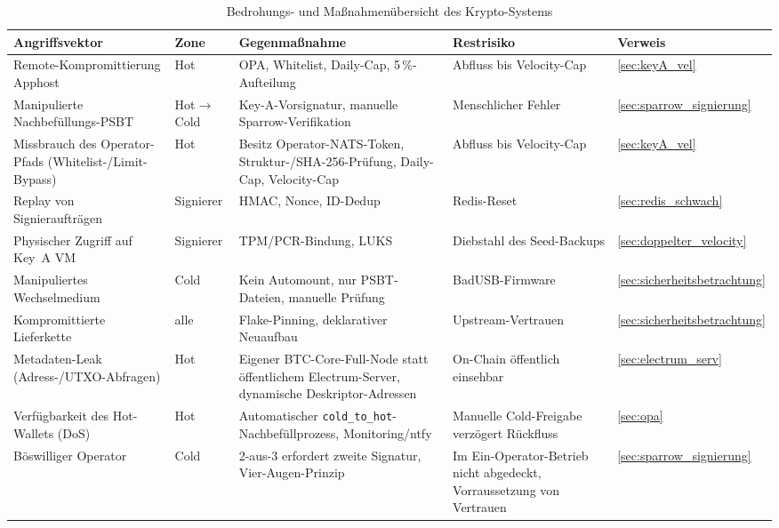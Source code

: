 \begin{table}[htbp]
\centering
\footnotesize
\begin{tabular}{@{}p{3.3cm} l p{4.0cm} p{3.4cm} l@{}}
\toprule
\textbf{Angriffsvektor} & \textbf{Zone} & \textbf{Gegenmaßnahme} & \textbf{Restrisiko} & \textbf{Verweis} \\
\midrule
Remote-Kompromittierung Apphost & Hot & \ac{OPA}, Whitelist, Daily-Cap, 5\,\%-Aufteilung & Abfluss bis Velocity-Cap & \ref{sec:keyA_vel} \\
\midrule
Manipulierte Nachbefüllungs-\ac{PSBT} & Hot$\to$Cold & Key-A-Vorsignatur, manuelle Sparrow-Verifikation & Menschlicher Fehler & \ref{sec:sparrow_signierung} \\
\midrule
Missbrauch des Operator-Pfads (Whitelist-/Limit-Bypass) & Hot & Besitz Operator-\ac{NATS}-Token, Struktur-/SHA-256-Prüfung, Daily-Cap, Velocity-Cap & Abfluss bis Velocity-Cap & \ref{sec:keyA_vel} \\
\midrule
Replay von Signieraufträgen & Signierer & \acs{HMAC}, Nonce, \acs{ID}-Dedup & Redis-Reset & \ref{sec:redis_schwach} \\
\midrule
Physischer Zugriff auf Key~A \ac{VM} & Signierer & \acs{TPM}/\acs{PCR}-Bindung, LUKS & Diebstahl des Seed-Backups & \ref{sec:doppelter_velocity} \\
\midrule
Manipuliertes Wechselmedium & Cold & Kein Automount, nur \ac{PSBT}-Dateien, manuelle Prüfung & BadUSB-Firmware & \ref{sec:sicherheitsbetrachtung} \\
\midrule
Kompromittierte Lieferkette & alle & Flake-Pinning, deklarativer Neuaufbau & Upstream-Vertrauen & \ref{sec:sicherheitsbetrachtung} \\
\midrule
Metadaten-Leak (Adress-/\acs{UTXO}-Abfragen) & Hot & Eigener \acs{BTC}-Core-Full-Node statt öffentlichem Electrum-Server, dynamische Deskriptor-Adressen & On-Chain öffentlich einsehbar & \ref{sec:electrum_serv} \\
\midrule
Verfügbarkeit des Hot-Wallets (\acs{DoS}) & Hot & Automatischer \texttt{cold\_to\_hot}-Nachbefüllprozess, Monitoring/ntfy & Manuelle Cold-Freigabe verzögert Rückfluss & \ref{sec:opa} \\
\midrule
Böswilliger Operator & Cold & 2-aus-3 erfordert zweite Signatur, Vier-Augen-Prinzip & Im Ein-Operator-Betrieb nicht abgedeckt, Vorraussetzung von Vertrauen & \ref{sec:sparrow_signierung} \\
\bottomrule
\end{tabular}
\caption{Bedrohungs- und Maßnahmenübersicht des Krypto-Systems}
\label{tab:threat_matrix}
\end{table}